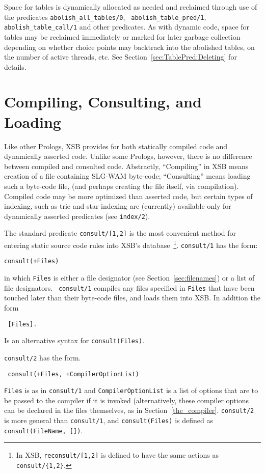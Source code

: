 Space for tables is dynamically allocated as needed and reclaimed
through use of the predicates {\tt abolish\_all\_tables/0}, {\tt
  abolish\_table\_pred/1}, {\tt abolish\_table\_call/1} and other
predicates.  As with dynamic code, space for tables may be reclaimed
immediately or marked for later garbage collection depending on
whether choice points may backtrack into the abolished tables, on the
number of active threads, etc.  See
Section~\ref{sec:TablePred:Deleting} for details.

\section{Compiling, Consulting, and Loading} \label{Consulting}
Like other Prologs, XSB provides for both statically compiled code and
dynamically asserted code.  Unlike some Prologs, however, there is no
difference between compiled and consulted code.  Abstractly,
``Compiling'' in XSB means creation of a file containing SLG-WAM
byte-code; ``Consulting'' means loading such a byte-code file, (and
perhaps creating the file itself, via compilation).  Compiled code may
be more optimized than asserted code, but certain types of indexing,
such as trie and star indexing are (currently) available only for
dynamically asserted predicates (see {\tt index/2}).

The standard predicate {\tt consult/[1,2]} is the most convenient
method for entering static source code rules into XSB's
database~\footnote{In XSB, {\tt reconsult/[1,2]} is defined to have
the same actions as {\tt consult/\{1,2\}}.}.  {\tt consult/1} has the
form: 
%
\begin{center}
{\tt consult(+Files)}
\end{center}
%
in which {\tt Files} is either a file designator (see
Section~\ref{sec:filenames}) or a list of file designators.  {\tt
consult/1} compiles any files specified in {\tt Files} that have been
touched later than their byte-code files, and loads them into XSB.  In
addition the form
%
\begin{center}{\tt
	    [Files]. 
}\end{center}
%
Is an alternative syntax for {\tt consult(Files)}.

{\tt consult/2} has the form.
\begin{center}{\tt
	consult(+Files, +CompilerOptionList) }
\end{center} 
{\tt Files} is as in {\tt consult/1} and {\tt CompilerOptionList}
is a list of options that are to be passed to the compiler if it is
invoked (alternatively, these compiler options can be declared in the
files themselves, as in Section~\ref{the_compiler}.  {\tt consult/2}
is more general than {\tt consult/1}, and {\tt consult(Files)} is
defined as {\tt 	consult(FileName, [])}.

